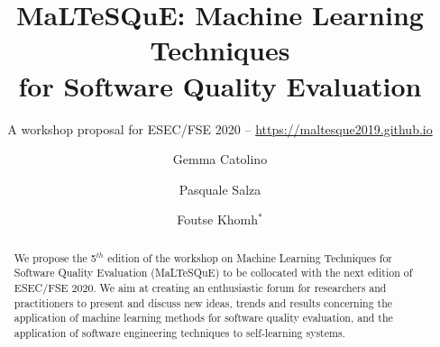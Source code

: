 \documentclass[sigconf,review]{acmart}
\begin{document}
	\title{MaLTeSQuE: Machine Learning Techniques \\
		for Software Quality Evaluation}
	\subtitle{A workshop proposal for ESEC/FSE 2020 -- \url{https://maltesque2019.github.io}}
	
	\author{Gemma Catolino}
	
		
	
	\author{Pasquale Salza}

\author{Foutse Khomh$^*$}
	
	

\begin{abstract}
We propose the 5$^{th}$ edition of the workshop on Machine Learning Techniques for Software Quality Evaluation (MaLTeSQuE) to be collocated with the next edition of ESEC/FSE 2020.
We aim at creating an enthusiastic forum for researchers and practitioners to present and discuss new ideas, trends and results concerning the application of machine learning methods for software quality evaluation, and the application of software engineering techniques to self-learning systems.
\end{abstract}


\maketitle









\balance
	
\end{document}

